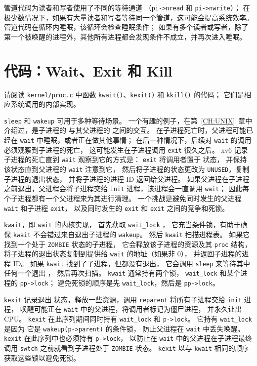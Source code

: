 管道代码为读者和写者使用了不同的等待通道
（\lstinline{pi->nread}
和
\lstinline{pi->nwrite}）；
在极少数情况下，如果有大量读者和写者等待同一个管道，这可能会提高系统效率。
管道代码在循环内睡眠，该循环会检查睡眠条件；
如果有多个读者或写者，除了第一个被唤醒的进程外，其他所有进程都会发现条件不成立，并再次进入睡眠。

\section{代码：Wait、Exit 和 Kill}

请阅读 {\tt kernel/proc.c} 中函数 {\tt kwait()}、{\tt kexit()} 和 {\tt kkill()} 的代码；
它们是相应系统调用的内部实现。

\lstinline{sleep}
和
\lstinline{wakeup}
可用于多种等待场景。
一个有趣的例子，在第~\ref{CH:UNIX}~章中介绍过，是子进程的 
与其父进程的  之间的交互。
在子进程死亡时，父进程可能已经在 {\tt wait} 中睡眠，或者正在做其他事情；
在后一种情况下，后续对 {\tt wait} 的调用必须观察到子进程的死亡，
这可能发生在子进程调用 {\tt exit} 很久之后。
xv6 记录子进程的死亡直到 {\tt wait} 观察到它的方式是：
{\tt exit} 将调用者置于  状态，
并保持该状态直到父进程的 {\tt wait} 注意到它，
然后将子进程的状态更改为 {\tt UNUSED}，复制子进程的退出状态，
并将子进程的进程 ID 返回给父进程。
如果父进程在子进程之前退出，父进程会将子进程交给
\lstinline{init}
进程，该进程会一直调用 {\tt wait}；
因此每个子进程都有一个父进程来为其进行清理。
一个挑战是避免同时发生的父进程
\lstinline{wait}
和子进程
\lstinline{exit}，
以及同时发生的
\lstinline{exit} 和 \lstinline{exit} 之间的竞争和死锁。

\lstinline{kwait}，即 {\tt wait} 的内核实现，
首先获取
\lstinline{wait_lock}
，
它充当条件锁，有助于确保 \lstinline{kwait} 不会错过来自退出子进程的 \lstinline{wakeup}。
然后 \lstinline{kwait} 扫描进程表。
如果它找到一个处于 \texttt{ZOMBIE} 状态的子进程，
它会释放该子进程的资源及其
\lstinline{proc} 结构，
将子进程的退出状态复制到提供给 \lstinline{wait} 的地址（如果非 0），
并返回子进程的进程 ID。
如果
\lstinline{kwait}
找到了子进程，但都没有退出，
它会调用
\lstinline{sleep}
来等待其中任何一个退出
，
然后再次扫描。
\lstinline{kwait} 通常持有两个锁，
\lstinline{wait_lock} 和某个进程的 \lstinline{pp->lock}；
避免死锁的顺序是先 \lstinline{wait_lock}，然后是 \lstinline{pp->lock}。

\lstinline{kexit}  记录退出
状态，释放一些资源，调用 \lstinline{reparent} 将所有子进程交给 \lstinline{init} 进程，
唤醒可能正在 \lstinline{wait} 中的父进程，将调用者标记为僵尸进程，
并永久让出 CPU。
\lstinline{kexit} 在此序列期间同时持有
\lstinline{wait_lock} 和 \lstinline{p->lock}。
它持有 \lstinline{wait_lock} 是因为
它是 \lstinline{wakeup(p->parent)} 的条件锁，
防止父进程在 \lstinline{wait} 中丢失唤醒。
\lstinline{kexit} 在此序列中也必须持有
\lstinline{p->lock}，
以防止在 \lstinline{wait} 中的父进程在子进程最终调用 \lstinline{swtch} 之前就看到子进程处于
\lstinline{ZOMBIE} 状态。
\lstinline{kexit} 以与 \lstinline{kwait} 相同的顺序获取这些锁以避免死锁。

